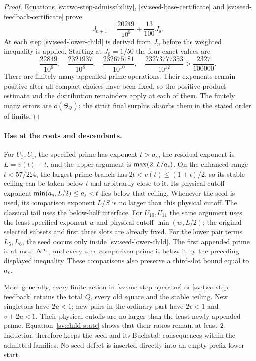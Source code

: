 \begin{proof}
Equations \eqref{sv:two-step-admissibility},
\eqref{sv:seed-base-certificate} and
\eqref{sv:seed-feedback-certificate} prove
\[
 J_{n+1}=\frac{20249}{10^6}+\frac{13}{100}J_n.
\]
At each step \eqref{sv:seed-lower-child} is derived from $J_n$
before the weighted inequality is applied. Starting at $J_0=1/50$
the four exact values are
\[
 \frac{22849}{10^6},\quad
 \frac{2321937}{10^8},\quad
 \frac{232675181}{10^{10}},\quad
 \frac{23273777353}{10^{12}}>\frac{2327}{100000}.
\]
There are finitely many appended-prime operations. Their exponents
remain positive after all compact choices have been fixed, so the
positive-product estimate and the distribution remainders apply at
each of them. The finitely many errors are $o(\Theta_Q)$; the strict
final surplus absorbs them in the stated order of limits.
\end{proof}

\paragraph{Use at the roots and descendants.}
For $U_3,U_4$, the specified prime has exponent $t>{a_{\rm s}}$, the residual
exponent is $L=v(t)-t$, and the upper argument is
$\max(2,L/{a_{\rm s}})$. On the enhanced range $t<57/224$, the largest-prime branch has
$2t<v(t)\le(1+t)/2$, so its stable ceiling can be taken below $t$
and arbitrarily close to it. Its physical cutoff exponent
$\min({a_{\rm s}},L/2)\le {a_{\rm s}}<t$ lies below that ceiling. Whenever the seed is used, its comparison exponent
$L/S$ is no larger than this physical cutoff. The classical tail
uses the below-half interface. For $U_{10},U_{11}$ the same argument
uses the least specified exponent $w$ and physical cutoff
$\min(w,L/2)$; the original selected subsets and first three slots
are already fixed. For the lower pair terms $L_5,L_6$, the seed
occurs only inside \eqref{sv:seed-lower-child}. The first appended
prime is at most $N^{a_{\rm s}}$, and every seed comparison prime is below
it by the preceding displayed inequality. These comparisons also
preserve a third-slot bound equal to ${a_{\rm s}}$.

More generally, every finite action in
\eqref{sv:one-step-operator} or \eqref{sv:two-step-feedback} retains
the total $Q$, every old square and the stable ceiling. New
singletons have $2u<1$; new pairs in the ordinary part have
$2v<1$ and $v+2u<1$. Their physical cutoffs are no larger than
the least newly appended prime. Equation~\eqref{sv:child-state}
shows that their ratios remain at least $2$. Induction therefore
keeps the seed and its Buchstab consequences within the admitted
families. No seed defect is inserted directly into an empty-prefix
lower start.

